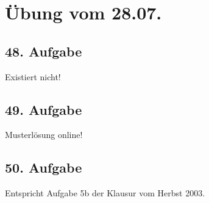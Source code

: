 \documentclass[a4paper,11pt,twoside,titlepage]{article}
\begin{document}
\newpage
\section{Übung vom 28.07.}

\subsection*{48. Aufgabe} 
Existiert nicht!

\subsection*{49. Aufgabe}
Musterlösung online!

\subsection*{50. Aufgabe}
Entspricht Aufgabe 5b der Klausur vom Herbst 2003.
\end{document}
